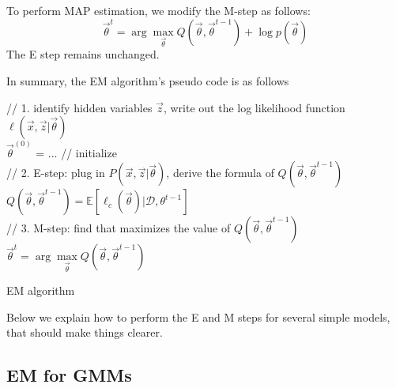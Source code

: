 To perform MAP estimation, we modify the M-step as follows:
\begin{equation}
\vec{\theta}^t=\arg\max_{\vec{\theta}} Q(\vec{\theta},\vec{\theta}^{t-1})+\log p(\vec{\theta})
\end{equation}
The E step remains unchanged.

In summary, the EM algorithm's pseudo code is as follows

\begin{algorithm}[htbp]

	// 1. identify hidden variables $\vec{z}$, write out the log likelihood function $\ell(\vec{x},\vec{z}|\vec{\theta})$ \\
	$\vec{\theta}^{(0)}$ = ... // initialize \\
	
	 {
	    // 2. E-step: plug in $P(\vec{x},\vec{z}|\vec{\theta})$, derive the formula of $Q(\vec{\theta}, \vec{\theta}^{t-1})$ \\
	    $Q(\vec{\theta}, \vec{\theta}^{t-1})=\mathbb{E}\left[\ell_c(\vec{\theta})| \mathcal{D},\theta^{t-1}\right]$ \\
	    // 3. M-step: find \vec{\theta} that maximizes the value of $Q(\vec{\theta}, \vec{\theta}^{t-1})$ \\
		$\vec{\theta}^t=\arg\max\limits_{\vec{\theta}} Q(\vec{\theta}, \vec{\theta}^{t-1})$ \\
	}
	
\caption{EM algorithm}
\end{algorithm}

Below we explain how to perform the E and M steps for several simple models, that should make things clearer.


\subsection{EM for GMMs}

